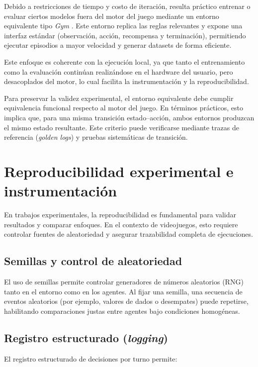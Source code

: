 Debido a restricciones de tiempo y costo de iteración, resulta práctico entrenar o evaluar ciertos modelos fuera del motor del juego mediante un entorno equivalente tipo \textit{Gym} \cite{brockman2016openai}. Este entorno replica las reglas relevantes y expone una interfaz estándar (observación, acción, recompensa y terminación), permitiendo ejecutar episodios a mayor velocidad y generar datasets de forma eficiente.

Este enfoque es coherente con la ejecución local, ya que tanto el entrenamiento como la evaluación continúan realizándose en el hardware del usuario, pero desacoplados del motor, lo cual facilita la instrumentación y la reproducibilidad.

Para preservar la validez experimental, el entorno equivalente debe cumplir equivalencia funcional respecto al motor del juego. En términos prácticos, esto implica que, para una misma transición estado--acción, ambos entornos produzcan el mismo estado resultante. Este criterio puede verificarse mediante trazas de referencia (\textit{golden logs}) y pruebas sistemáticas de transición.

\section{Reproducibilidad experimental e instrumentación}

En trabajos experimentales, la reproducibilidad es fundamental para validar resultados y comparar enfoques. En el contexto de videojuegos, esto requiere controlar fuentes de aleatoriedad y asegurar trazabilidad completa de ejecuciones.

\subsection{Semillas y control de aleatoriedad}

El uso de semillas permite controlar generadores de números aleatorios (RNG) tanto en el entorno como en los agentes. Al fijar una semilla, una secuencia de eventos aleatorios (por ejemplo, valores de dados o desempates) puede repetirse, habilitando comparaciones justas entre agentes bajo condiciones homogéneas.

\subsection{Registro estructurado (\textit{logging})}

El registro estructurado de decisiones por turno permite:

